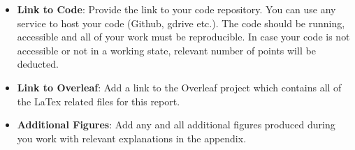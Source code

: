 \documentclass[conference]{IEEEtran}
\begin{document}



\appendix
\begin{itemize}
	\item \textbf{Link to Code}: Provide the link to your code repository. You can use any service to host your code (Github, gdrive etc.). The code should be running, accessible and all of your work must be reproducible. In case your code is not accessible or not in a working state, relevant number of points will be deducted.   
	\item \textbf{Link to Overleaf}: Add a link to the Overleaf project which contains all of the LaTex related files for this report.
	\item \textbf{Additional Figures}: Add any and all additional figures produced during you work with relevant explanations in the appendix.
\end{itemize}
\end{document}
